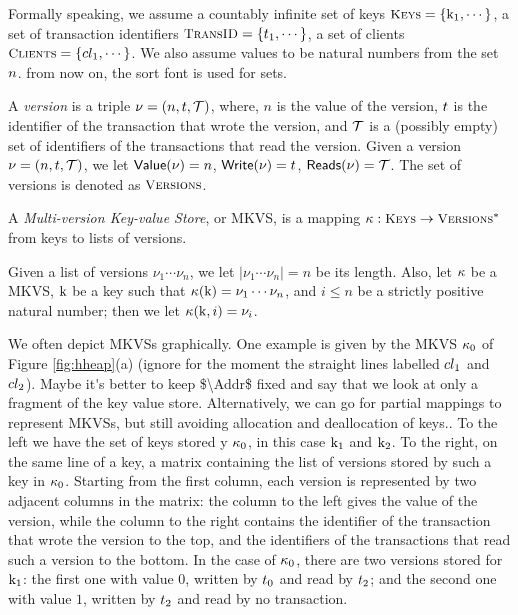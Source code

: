 Formally speaking, we assume a countably infinite set of keys $\Addr = \{\key{k}_1, \cdots\}$, a set of transaction identifiers $\TxID = 
\{ \tsid_1, \cdots \}$, 
a set of clients $\tidset = \{\tid_1, \cdots \}$.
We also assume values to be natural numbers from the set $n$. 
\ac{from now on, the sort font is used for sets.}
\begin{definition}
\label{def:hheap}
A \emph{version} is a triple $\nu = ( n, t, \mathcal{T})$, where, 
$n$ is the value of the version, $t$ is the identifier of the transaction 
that wrote the version, and $\mathcal{T}$ is a (possibly empty) set of identifiers of 
the transactions that read the version. Given a version $\nu = (n, t, \mathcal{T})$, 
we let $\mathsf{Value}(\nu) = n$, $\mathsf{Write}(\nu) = t$, $\mathsf{Reads}(\nu) = \mathcal{T}$. 
The set of versions is denoted as $\Versions$.

A \emph{Multi-version Key-value Store}, or MKVS, is a mapping  
$\hh : \Addr \rightarrow \Versions^{\ast}$ from keys to lists of versions. 
\end{definition}
Given a list of versions $\nu_1 \cdots \nu_{n}$, 
we let $\lvert \nu_1 \cdots \nu_{n} \rvert = n$ be 
its length. Also, let $\kappa$ be a MKVS, $\mathrm{k}$ be a key 
such that $\kappa(\mathrm{k}) = \nu_1 \cdots \nu_n$, and 
$i \leq n$ be a strictly positive natural number; then we let 
$\kappa(\mathrm{k}, i) = \nu_i$. 

We often depict MKVSs graphically. 
One example is given by the MKVS $\kappa_0$ of Figure \ref{fig:hheap}(a) (ignore for the moment 
the straight lines labelled $cl_1$ and $cl_2$).
\ac{Maybe it's better to keep $\Addr$ fixed and say that we look at only a 
fragment of the key value store. Alternatively, we can go for partial mappings to 
represent MKVSs, but still avoiding allocation and deallocation of keys.}. To the left 
we have the set of keys stored y $\kappa_0$, in this case $\mathrm{k}_1$ and 
$\mathrm{k}_2$. To the right, on the same line of a key, a matrix containing the
 list of versions stored by such a key in $\kappa_0$. Starting from the first column, 
 each version is represented by two adjacent columns in the matrix: the 
 column to the left gives the value of the version, while the column to the 
 right contains the identifier of the transaction that wrote the version to the 
 top, and the identifiers of the transactions that read such a version to the bottom.
In the case of $\kappa_0$, there are two versions stored for $\mathrm{k}_1$: 
the first one with value $0$, written by $t_0$ and read by $t_2$; 
and the second one with value $1$, written by $t_2$ and read by no 
transaction. 

